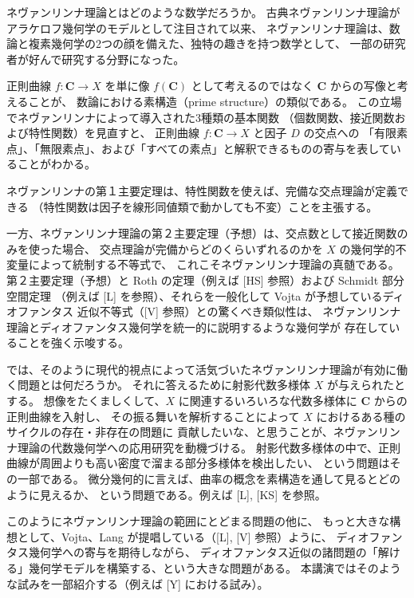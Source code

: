 \documentclass[uplatex,dvipdfmx]{jlreq}
\begin{document}
\bigskip
\hspace*{\fill}{\large\bfseries 小林　亮一（名古屋大・多元数理）}

\bigskip

ネヴァンリンナ理論とはどのような数学だろうか。
古典ネヴァンリンナ理論がアラケロフ幾何学のモデルとして注目されて以来、
ネヴァンリンナ理論は、数論と複素幾何学の2つの顔を備えた、独特の趣きを持つ数学として、
一部の研究者が好んで研究する分野になった。

\medskip

正則曲線 $f : \mathbf{C} \to X$ を単に像 $f(\mathbf{C})$ として考えるのではなく
$\mathbf{C}$ からの写像と考えることが、
数論における素構造（prime structure）の類似である。
この立場でネヴァンリンナによって導入された3種類の基本関数
（個数関数、接近関数および特性関数）を見直すと、
正則曲線 $f : \mathbf{C} \to X$ と因子 $D$ の交点への
「有限素点」、「無限素点」、および「すべての素点」と解釈できるものの寄与を表していることがわかる。

ネヴァンリンナの第１主要定理は、特性関数を使えば、完備な交点理論が定義できる
（特性関数は因子を線形同値類で動かしても不変）ことを主張する。

一方、ネヴァンリンナ理論の第２主要定理（予想）は、交点数として接近関数のみを使った場合、
交点理論が完備からどのくらいずれるのかを $X$ の幾何学的不変量によって統制する不等式で、
これこそネヴァンリンナ理論の真髄である。
第２主要定理（予想）と Roth の定理（例えば [HS] 参照）および Schmidt 部分空間定理
（例えば [L] を参照）、それらを一般化して Vojta が予想しているディオファンタス
近似不等式（[V] 参照）との驚くべき類似性は、
ネヴァンリンナ理論とディオファンタス幾何学を統一的に説明するような幾何学が
存在していることを強く示唆する。

\medskip

では、そのように現代的視点によって活気づいたネヴァンリンナ理論が有効に働く問題とは何だろうか。
それに答えるために射影代数多様体 $X$ が与えられたとする。
想像をたくましくして、$X$ に関連するいろいろな代数多様体に $\mathbf{C}$ からの正則曲線を入射し、
その振る舞いを解析することによって $X$ におけるある種のサイクルの存在・非存在の問題に
貢献したいな、と思うことが、ネヴァンリンナ理論の代数幾何学への応用研究を動機づける。
射影代数多様体の中で、正則曲線が周囲よりも高い密度で溜まる部分多様体を検出したい、
という問題はその一部である。
微分幾何的に言えば、曲率の概念を素構造を通して見るとどのように見えるか、
という問題である。例えば [L], [KS] を参照。

このようにネヴァンリンナ理論の範囲にとどまる問題の他に、
もっと大きな構想として、Vojta、Lang が提唱している（[L], [V] 参照）ように、
ディオファンタス幾何学への寄与を期待しながら、
ディオファンタス近似の諸問題の「解ける」幾何学モデルを構築する、という大きな問題がある。
本講演ではそのような試みを一部紹介する（例えば [Y] における試み）。
\end{document}
